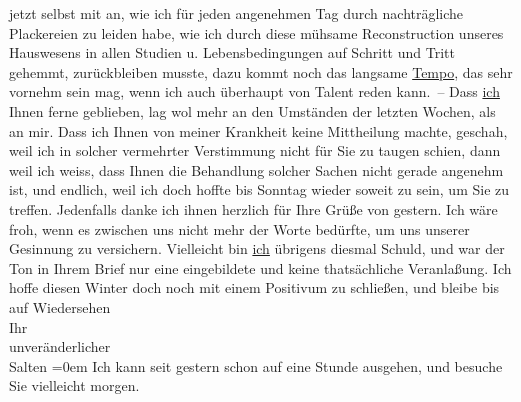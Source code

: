 \begin{ledgroupsized}[t]{13cm}
               jetzt selbst mit an, wie ich für jeden ange{\pb}nehmen Tag durch
               nachträgliche Plackereien zu leiden habe, wie ich durch diese mühsame Reconstruction
               unseres Hauswesens in allen Studien u. Lebensbedingungen auf Schritt und Tritt
               gehemmt, zurückbleiben musste, dazu kommt noch das langsame \uline{Tempo}, das sehr vornehm sein mag, wenn ich \introOben{}auch\introOben{} überhaupt von Talent reden kann. –\pend
           \pstart
           Dass \uline{ich} Ihnen ferne geblieben, lag wol mehr an den
               Umständen der letzten Wochen, als an mir. Dass ich Ihnen von meiner Krankheit keine
               Mittheilung machte, geschah, weil ich in solcher vermehrter {\pb}Verstimmung nicht für Sie zu
               taugen schien, dann weil ich weiss, dass Ihnen die Behandlung solcher Sachen nicht
               gerade angenehm ist, und endlich, weil ich doch hoffte bis Sonntag
               wieder soweit zu sein, um Sie zu treffen. \pend
           \pstart
           Jedenfalls danke ich ihnen herzlich für Ihre Grüße von gestern. Ich wäre froh, wenn
               es zwischen uns nicht mehr der Worte bedürfte, um uns unserer Gesinnung zu
               versichern. Vielleicht bin \uline{ich} übrigens diesmal
               Schuld, und war der Ton in Ihrem Brief nur eine eingebildete und keine thatsächliche
               Veranlaßung. \pend
           \pstart
           Ich hoffe diesen Winter doch noch mit einem Positivum zu schließen, und bleibe
               bis auf Wiedersehen {\\[\baselineskip]}Ihr {\\[\baselineskip]}unveränderlicher {\\[\baselineskip]}\spacefill\mbox{Salten}\pend
           \leftskip=0em{}\pstart
           \noindent{}Ich kann seit gestern schon auf eine Stunde ausgehen, und besuche Sie vielleicht
                  morgen. \pend
           
         
         \endnumbering{}\end{ledgroupsized}\begin{anhang}\end{anhang}\newcommand{\dateiname}{L03132}\newcommand{\titel}{Felix Salten an Arthur Schnitzler, [24. 1. 1894]}\newcommand{\editorInnen}{Martin Anton Müller und Laura Untner}
      